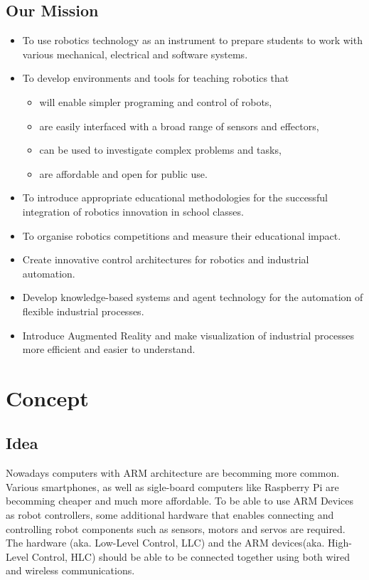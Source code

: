 \documentclass[11pt,a4paper]{article}
\begin{document}
\subsection{Our Mission}

\begin{itemize}
  \item To use robotics technology as an instrument to prepare students to work with various mechanical, electrical and software systems.
  \item To develop environments and tools for teaching robotics that
    \begin{itemize}
    \item will enable simpler programing and control of robots,
    \item are easily interfaced with a broad range of sensors and effectors,
    \item can be used to investigate complex problems and tasks,
    \item are affordable and open for public use.
  \end{itemize}
  \item To introduce appropriate educational methodologies for the successful integration of robotics innovation in school classes.
  \item To organise robotics competitions and measure their educational impact.
  \item Create innovative control architectures for robotics and industrial automation.
  \item Develop knowledge-based systems and agent technology for the automation of flexible industrial processes.
  \item Introduce Augmented Reality and make visualization of industrial processes more efficient and easier to understand.
\end{itemize}


\newpage
\section{Concept}
\subsection{Idea}
Nowadays computers with ARM architecture are becomming more common. Various smartphones, as well as sigle-board computers like Raspberry Pi are becomming cheaper and much more affordable. To be able to use ARM Devices as robot controllers, some additional hardware that enables connecting and controlling robot components such as sensors, motors and servos are required. The hardware (aka. Low-Level Control, LLC) and the ARM devices(aka. High-Level Control, HLC) should be able to be connected together using both wired and wireless communications.\\
\end{document}
